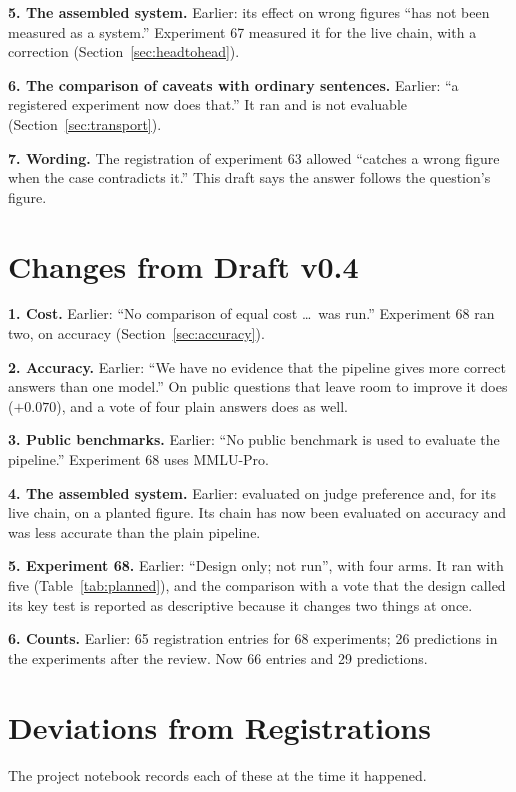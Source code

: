 \documentclass[10pt,twocolumn]{article}
\begin{document}
\textbf{5. The assembled system.} Earlier: its effect on wrong figures
``has not been measured as a system.'' Experiment 67 measured it for
the live chain, with a correction (Section~\ref{sec:headtohead}).

\textbf{6. The comparison of caveats with ordinary sentences.} Earlier:
``a registered experiment now does that.'' It ran and is not evaluable
(Section~\ref{sec:transport}).

\textbf{7. Wording.} The registration of experiment 63 allowed
``catches a wrong figure when the case contradicts it.'' This draft
says the answer follows the question's figure.

\section{Changes from Draft v0.4}
\label{app:v04}

\textbf{1. Cost.} Earlier: ``No comparison of equal cost \ldots\ was
run.'' Experiment 68 ran two, on accuracy (Section~\ref{sec:accuracy}).

\textbf{2. Accuracy.} Earlier: ``We have no evidence that the pipeline
gives more correct answers than one model.'' On public questions that
leave room to improve it does ($+0.070$), and a vote of four plain
answers does as well.

\textbf{3. Public benchmarks.} Earlier: ``No public benchmark is used to
evaluate the pipeline.'' Experiment 68 uses MMLU-Pro.

\textbf{4. The assembled system.} Earlier: evaluated on judge
preference and, for its live chain, on a planted figure. Its chain has
now been evaluated on accuracy and was less accurate than the plain
pipeline.

\textbf{5. Experiment 68.} Earlier: ``Design only; not run'', with four
arms. It ran with five (Table~\ref{tab:planned}), and the comparison
with a vote that the design called its key test is reported as
descriptive because it changes two things at once.

\textbf{6. Counts.} Earlier: 65 registration entries for 68 experiments;
26 predictions in the experiments after the review. Now 66 entries and
29 predictions.

\section{Deviations from Registrations}
\label{app:deviations}

The project notebook records each of these at the time it happened.
\end{document}
